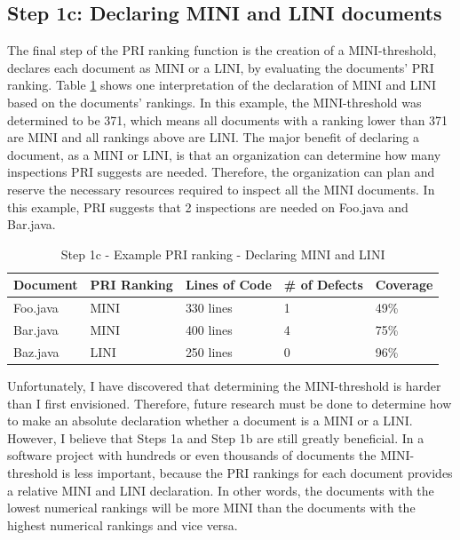 
\subsection{Step 1c: Declaring MINI and LINI documents}
The final step of the PRI ranking function is the creation of a
MINI-threshold, declares each document as MINI or a LINI, by evaluating the
documents' PRI ranking. Table \ref{table:step1c} shows one interpretation
of the declaration of MINI and LINI based on the documents' rankings. In
this example, the MINI-threshold was determined to be 371, which means all
documents with a ranking lower than 371 are MINI and all rankings above are
LINI. The major benefit of declaring a document, as a MINI or LINI, is that
an organization can determine how many inspections PRI suggests are needed.
Therefore, the organization can plan and reserve the necessary resources
required to inspect all the MINI documents. In this example, PRI suggests
that 2 inspections are needed on Foo.java and Bar.java.

\begin{table}[htbp]
  \caption{Step 1c - Example PRI ranking - Declaring MINI and LINI}
  \label{table:step1c}
  \begin{center}
    \begin{tabular}{|l|l|l|l|l|} \hline
      {\bf Document} & {\bf PRI Ranking} & {\bf Lines of Code} & 
      {\bf \# of Defects} & {\bf Coverage} \\ \hline
Foo.java & MINI & 330 lines & 1 & 49\%  \\ \hline 
Bar.java & MINI & 400 lines & 4 & 75\% \\ \hline 
Baz.java & LINI & 250 lines & 0 & 96\% \\ \hline 
    \end{tabular}
  \end{center}
\end{table}

Unfortunately, I have discovered that determining the MINI-threshold is
harder than I first envisioned. Therefore, future research must be done to
determine how to make an absolute declaration whether a document is a MINI
or a LINI. However, I believe that Steps 1a and Step 1b are still greatly
beneficial. In a software project with hundreds or even thousands of
documents the MINI-threshold is less important, because the PRI rankings
for each document provides a relative MINI and LINI declaration. In other
words, the documents with the lowest numerical rankings will be more MINI
than the documents with the highest numerical rankings and vice versa.


